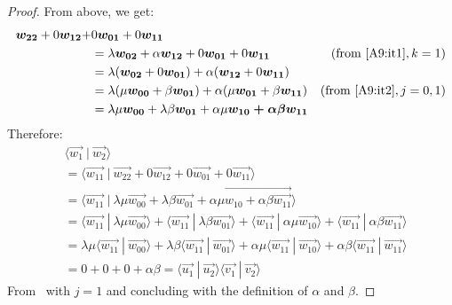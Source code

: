 \documentclass[runningheads,orivec,envcountsame,envcountsect]{llncs}
\def\scal#1#2{\langle{#1}~|~{#2}\rangle}
\begin{document}
\begin{lemma}
\begin{proof}
    From above, we get:
    \begin{align*}
        \vec{w_{22}} + 0\vec{w_{12}} + &0\vec{w_{01}} + 0\vec{w_{11}} \\
        &= \lambda\vec{w_{02}} + \alpha\vec{w_{12}} + 0\vec{w_{01}} + 0\vec{w_{11}} & (\text{from~\Cref{A9:it1}}, k =1)\\
        &= \lambda(\vec{w_{02}}+0\vec{w_{01}}) + \alpha(\vec{w_{12}}+0\vec{w_{11}})&\\
        &= \lambda(\mu\vec{w_{00}} + \beta\vec{w_{01}}) + \alpha(\mu\vec{w_{01}}+\beta\vec{w_{11}}) & (\text{from~\Cref{A9:it2}}, j=0,1)\\
        &= \lambda\mu\vec{w_{00}} + \lambda\beta\vec{w_{01}} + \alpha\mu\vec{w_{10} + \alpha\beta\vec{w_{11}}}
    \end{align*}
    Therefore:
    \begin{align*}
        &\scal{\vec{w_1}}{\vec{w_2}} \\
        &= \scal{\vec{w_{11}}}{\vec{w_{22}} + 0 \vec{w_{12}} + 0 \vec{w_{01}} + 0 \vec{w_{11}}}\\
        &= \scal{\vec{w_{11}}}{\lambda\mu\vec{w_{00}} + \lambda\beta\vec{w_{01}} + \alpha\mu\vec{w_{10} + \alpha\beta\vec{w_{11}}}}\\
        &=\scal{\vec{w_{11}}}{\lambda\mu\vec{w_{00}}} + \scal{\vec{w_{11}}}{\lambda\beta\vec{w_{01}}} + \scal{\vec{w_{11}}}{\alpha\mu\vec{w_{10}}} + \scal{\vec{w_{11}}}{\alpha\beta\vec{w_{11}}}\\
        &=\lambda\mu\scal{\vec{w_{11}}}{\vec{w_{00}}} + \lambda\beta\scal{\vec{w_{11}}}{\vec{w_{01}}} + \alpha\mu\scal{\vec{w_{11}}}{\vec{w_{10}}} + \alpha\beta\scal{\vec{w_{11}}}{\vec{w_{11}}}\\
        &= 0 + 0 + 0 + \alpha\beta = \scal{\vec{u_1}}{\vec{u_2}}\scal{\vec{v_1}}{\vec{v_2}}
    \end{align*}
    From~ with $j=1$ and concluding with the definition of $\alpha$ and $\beta$.
\end{proof}
\end{lemma}
\end{document}
